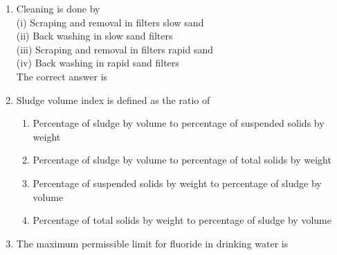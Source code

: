 \documentclass[11pt,a4paper]{article}
\begin{document}
\begin{enumerate}
{(iii) Increase in temperature of water \\

(iv) Decrease in temperature of water \\

The correct answer is}
\\
\item{Cleaning is done by \\
 (i) Scraping and removal in filters slow sand \\
 (ii) Back washing in slow sand filters \\
 (iii) Scraping and removal in filters rapid sand \\
 (iv) Back washing in rapid sand filters \\
The correct answer is}
\\
\item{Sludge volume index is defined as the ratio of}
\begin{enumerate}[label=\Alph*.]
\item{Percentage of sludge by volume to percentage of suspended solids by weight}
\item{Percentage of sludge by volume to percentage of total solids by weight}
\item{Percentage of suspended solids by weight to percentage of sludge by volume}
\item{Percentage of total solids by weight to percentage of sludge by volume}
\end{enumerate}
\item{The maximum permissible limit for fluoride in drinking water is}
\\
\end{enumerate}
\end{document}
